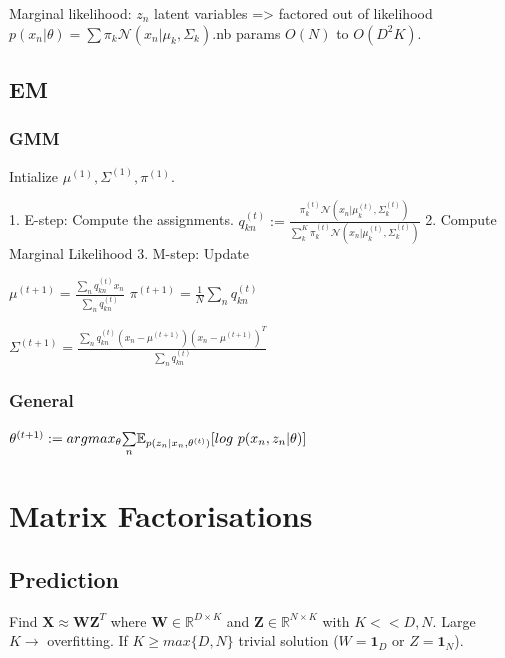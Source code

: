 Marginal likelihood: $z_n$ latent variables => factored out of likelihood \newline $p(x_n|\theta) = \sum \pi_k \mathcal{N}(x_n|\mu_k, \Sigma_k)$.\newline nb params $O(N)$ to $O(D^2K)$.

\subsection{EM}
\subsubsection{GMM}
Intialize $\mu^{(1)}, \Sigma^{(1)}, \pi^{(1)}$.

1. E-step: Compute the assignments. $q_{kn}^{(t)} := \frac{\pi_k^{(t)} \mathcal{N}(x_n|\mu_k^{(t)}, \Sigma_k^{(t)})}{ \sum_k^K\pi_k^{(t)} \mathcal{N}(x_n|\mu_k^{(t)}, \Sigma_k^{(t)}) }$
2. Compute Marginal Likelihood
3. M-step: Update

$\mu^{(t+1)} = \frac{\underset{n}{\sum} q_{kn}^{(t)} x_n}{\underset{n}{\sum} q_{kn}^{(t)}}$ $\pi^{(t+1)} = \frac{1}{N} \underset{n}{\sum} q_{kn}^{(t)}$

$\Sigma^{(t+1)} = \frac{\underset{n}{\sum} q_{kn}^{(t)}(x_n - \mu^{(t+1)})(x_n - \mu^{(t+1)})^T}{\underset{n}{\sum} q_{kn}^{(t)}}$
\newline

\subsubsection{General}
$\theta^{(t+1)} := argmax_{\theta} \underset{n}{\sum} \mathbb{E}_{p(z_n|x_n,\theta^{(t)})}\newline[log\,\, p(x_n,z_n|\theta)]$

\section{Matrix Factorisations}
\subsection{Prediction}
Find $\mathbf{X} \approx \mathbf{W}\mathbf{Z}^T$ where $\mathbf{W} \in \mathbb{R}^{D\times K}$ and $\mathbf{Z} \in \mathbb{R}^{N\times K}$ with $K << D,N$. Large $K\rightarrow$ overfitting. If $K \ge max\{D,N\}$ trivial solution ($W=\mathbf{1}_D$ or $Z=\mathbf{1}_N$).

